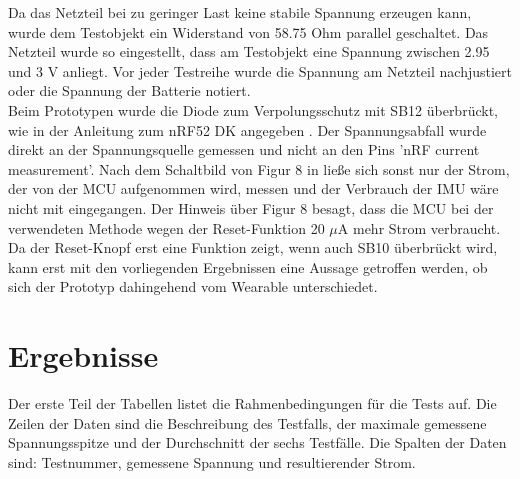 Da das Netzteil bei zu geringer Last keine stabile Spannung erzeugen kann, wurde dem Testobjekt ein Widerstand von 58.75 Ohm parallel geschaltet.
Das Netzteil wurde so eingestellt, dass am Testobjekt eine Spannung zwischen 2.95 und 3 V anliegt.
Vor jeder Testreihe wurde die Spannung am Netzteil nachjustiert oder die Spannung der Batterie notiert.\\
Beim Prototypen wurde die Diode zum Verpolungsschutz mit SB12 überbrückt, wie in der Anleitung zum nRF52 DK angegeben \cite{site_nrf52dk}.
Der Spannungsabfall wurde direkt an der Spannungsquelle gemessen und nicht an den Pins 'nRF current measurement'.
Nach dem Schaltbild von Figur 8 in \cite{site_nrf52dk} ließe sich sonst nur der Strom, der von der MCU aufgenommen wird, messen und der Verbrauch der IMU wäre nicht mit eingegangen.
Der Hinweis über Figur 8 besagt, dass die MCU bei der verwendeten Methode wegen der Reset-Funktion 20 $\mu$A mehr Strom verbraucht.
Da der Reset-Knopf erst eine Funktion zeigt, wenn auch SB10 überbrückt wird, kann erst mit den vorliegenden Ergebnissen eine Aussage getroffen werden, ob sich der Prototyp dahingehend vom Wearable unterschiedet.

\section{Ergebnisse}
Der erste Teil der Tabellen listet die Rahmenbedingungen für die Tests auf.
Die Zeilen der Daten sind die Beschreibung des Testfalls, der maximale gemessene Spannungsspitze und der Durchschnitt der sechs Testfälle.
Die Spalten der Daten sind: Testnummer, gemessene Spannung und resultierender Strom.

